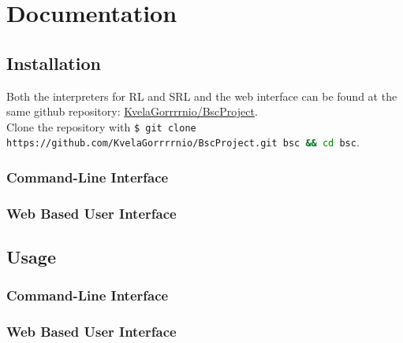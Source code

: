 \chapter*{Documentation}
%

\section*{Installation}
%

Both the interpreters for RL and SRL and the web interface can be found at the same github repository: \href{https://github.com/KvelaGorrrrnio/BscProject}{KvelaGorrrrnio/BscProject}.\\
Clone the repository with \lstinline[language=bash]{$ git clone https://github.com/KvelaGorrrrnio/BscProject.git bsc && cd bsc}.

\subsection*{Command-Line Interface}
%

\subsection*{Web Based User Interface}
%

\section*{Usage}
%

\subsection*{Command-Line Interface}
%

\subsection*{Web Based User Interface}
%

